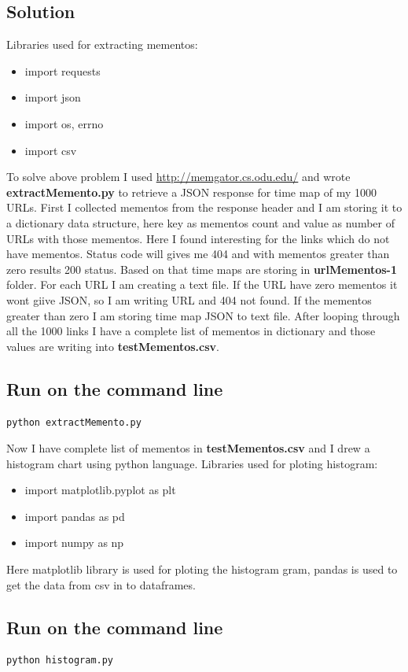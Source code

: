 \documentclass[letterpaper,11pt]{article}
\begin{document}
\subsection*{Solution}
Libraries used for extracting mementos:
\begin{itemize}
 \item import requests
 \item import json
 \item import os, errno
 \item import csv
\end{itemize}
To solve above problem I used  \url{http://memgator.cs.odu.edu/} and wrote \textbf{extractMemento.py}  to retrieve a JSON response for time map of my 1000 URLs. First I collected mementos from the response header and I am storing it to a dictionary data structure, here key as mementos count and value as number of URLs with those mementos. Here I found interesting for the links which do not have mementos.
Status code will gives me 404 and with mementos greater than zero results 200 status. 
Based on that time maps are storing  in \textbf{urlMementos-1}  folder. For each URL I am creating a text file.  If the URL have zero mementos it wont giive JSON, so I am writing URL and 404 not found. If the mementos greater than zero I am storing time map JSON to text file.   After looping through all the 1000 links I have a complete list of mementos in dictionary and those values are writing into \textbf{testMementos.csv}.
\begin{itemize}
 \subsection*{Run on the command line}
\begin{lstlisting}[frame=single]
python extractMemento.py
\end{lstlisting}

Now  I have complete list of mementos in \textbf{testMementos.csv} and I drew a histogram chart using python language. 
Libraries used for ploting histogram:
\begin{itemize}
 \item import matplotlib.pyplot as plt
 \item import pandas as pd
 \item import numpy as np
\end{itemize}
Here matplotlib library is used for ploting the histogram gram, pandas is used to get the data from csv in to dataframes.
\subsection*{Run on the command line}
\begin{lstlisting}[frame=single]
python histogram.py
\end{lstlisting}

\end{itemize}  
\end{document}
